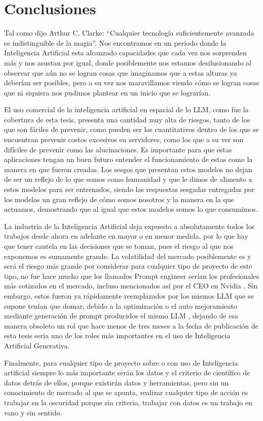 
\chapter{Conclusiones}

\par Tal como dijo Arthur C. Clarke: ``Cualquier tecnología suficientemente avanzada es indistinguible de la magia''. Nos encontramos 
en un periodo donde la Inteligencia Artificial esta alcanzado capacidades que cada vez nos sorprenden más y nos asustan por igual, donde 
posiblemente nos estamos desilusionando al observar que aún no se logran cosas que imaginamos que a estas alturas ya deberían ser posibles, pero a su vez nos maravillamos viendo cómo se logran 
cosas que ni siquiera nos pudimos plantear en un inicio que se lograrían.  

\par El uso comercial de la inteligencia artificial en espacial de lo LLM, como fue la cobertura de esta tesis, presenta una cantidad 
muy alta de riesgos, tanto de los que son fáciles de prevenir, como pueden ser los cuantitativos dentro de los que se encuentran prevenir costos excesivos en 
servidores, como los que a su ver son difíciles de prevenir como las alucinaciones.  Es importante para que estas aplicaciones tengan un buen futuro 
entender el funcionamiento de estas como la manera en que fueron creadas. Los sesgos que presentan estos modelos no dejan de ser un reflejo
de lo que somos como humanidad y que le dimos de alimento a estos modelos para ser entrenados, siendo las respuestas sesgadas entregadas por los modelos un gran reflejo de cómo somos nosotros 
y la manera en la que actuamos, demostrando que al igual que estos modelos somos lo que consumimos.  

\par La industria de la Inteligencia Artificial deja expuesto a absolutamente todos los trabajos desde ahora en adelante en mayor 
o en menor medida, por lo que hay que tener cautela en las decisiones que se toman, pues el riesgo al que nos exponemos es sumamente grande. La 
volatilidad del mercado posiblemente es y será el riesgo más grande por considerar para cualquier tipo de proyecto de este tipo, 
no fue hace mucho que los llamados Prompt engineer serían los profesionales más cotizados en el mercado, incluso mencionados así por el CEO en 
Nvidia \cite{conclusion1}. Sin embargo, estos fueron ya rápidamente reemplazados por los mismos LLM que se supone tenían que domar, debido a la optimización \cite{conclusion2}
o el auto mejoramiento mediante generación de prompt producidos el mismo LLM \cite{conclusion3}, dejando de esa manera obsoleto un rol que hace menos de 
 tres meses a la fecha de publicación de esta tesis seria uno de los roles más importantes en el uso de Inteligencia Artificial Generativa.

\par Finalmente, para cualquier tipo de proyecto sobre o con uso de Inteligencia artificial siempre lo más importante serán los datos y el 
criterio de científico de datos detrás de ellos, porque existirán datos y herramientas, pero sin un conocimiento de mercado al que se apunta, 
realizar cualquier tipo de acción es trabajar en la oscuridad porque sin criterio, trabajar con datos es un trabajo en vano y sin sentido.
